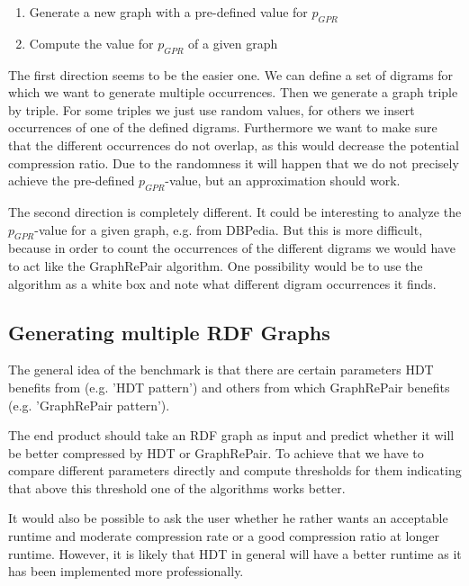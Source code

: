 \documentclass[a4paper]{scrartcl}
\begin{document}
\begin{itemize}
\begin{enumerate}
	\item Generate a new graph with a pre-defined value for $p_{GPR}$
	\item Compute the value for $p_{GPR}$ of a given graph
\end{enumerate}

The first direction seems to be the easier one. We can define a set of digrams for which we want to generate multiple occurrences. Then we generate a graph triple by triple. For some triples we just use random values, for others we insert occurrences of one of the defined digrams. Furthermore we want to make sure that the different occurrences do not overlap, as this would decrease the potential compression ratio. Due to the randomness it will happen that we do not precisely achieve the pre-defined $p_{GPR}$-value, but an approximation should work.

The second direction is completely different. It could be interesting to analyze the $p_{GPR}$-value for a given graph, e.g. from DBPedia. But this is more difficult, because in order to count the occurrences of the different digrams we would have to act like the GraphRePair algorithm. One possibility would be to use the algorithm as a white box and note what different  digram occurrences it finds.

\end{itemize}


\subsection*{Generating multiple RDF Graphs}

The general idea  of the benchmark is that there are certain parameters HDT benefits from (e.g. 'HDT pattern') and others from which GraphRePair benefits (e.g. 'GraphRePair pattern').

The end product should take an RDF graph as input and predict whether it will be better compressed by HDT or GraphRePair. To achieve that we have to compare different parameters directly and compute thresholds for them indicating that above this threshold one of the algorithms works better.

It would also be possible to ask the user whether he rather wants an acceptable runtime and moderate compression rate or a good compression ratio at longer runtime. However, it is likely that HDT in general will have a better runtime as it has been implemented more professionally.
\end{document}
